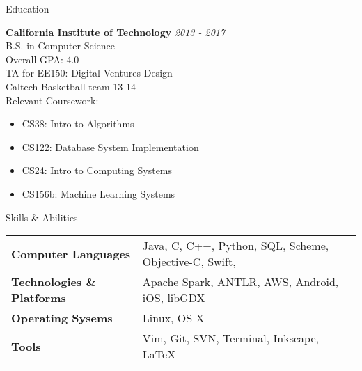 \documentclass{resume} %
\begin{document}

\begin{rSection}{Education}

{\bf California Institute of Technology} \hfill {\em 2013 - 2017} \\
B.S. in Computer Science \smallskip \\
Overall GPA: 4.0 \\
TA for EE150: Digital Ventures Design \\
Caltech Basketball team 13-14 \smallskip \\
Relevant Coursework:
\vspace{-5.0mm}
\begin{minipage}{0.4\linewidth}
\begin{itemize}
\item{CS38: Intro to Algorithms}
\item{CS122: Database System Implementation}
\end{itemize}
\end{minipage}
\begin{minipage}{0.4\linewidth}
\begin{itemize}
    \item{CS24: Intro to Computing Systems}
\item{CS156b: Machine Learning Systems}
\end{itemize}
\end{minipage}
\vspace{2mm}
\end{rSection}


\begin{rSection}{Skills \& Abilities}

\begin{tabularx}{\textwidth}{@{}lX}
    \bfseries{Computer Languages}   &  Java, C, C++, Python, SQL, Scheme, Objective-C, Swift,  \\
    \bfseries{Technologies \& Platforms}   &  Apache Spark, ANTLR, AWS, Android, iOS, libGDX \\
    \bfseries{Operating Sysems}   &  Linux, OS X \\
    \bfseries{Tools}   &  Vim, Git, SVN, Terminal, Inkscape, \LaTeX \\
\end{tabularx}

\end{rSection}
\end{document}
